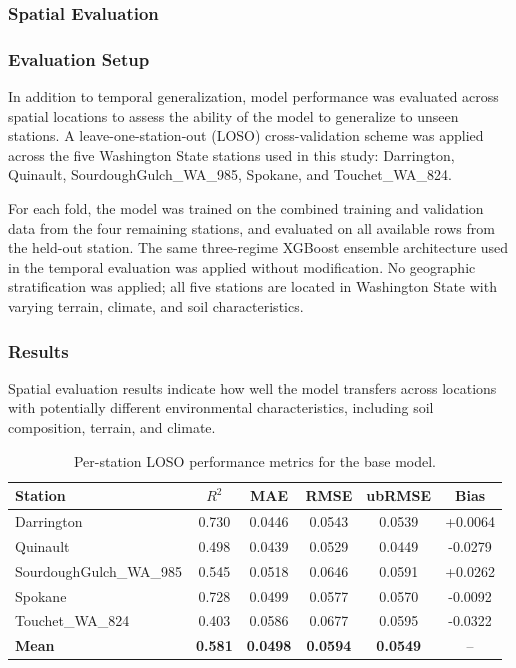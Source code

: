 \subsubsection*{Spatial Evaluation}

\subsubsection*{Evaluation Setup}
In addition to temporal generalization, model performance was evaluated across spatial locations
to assess the ability of the model to generalize to unseen stations. A leave-one-station-out
(LOSO) cross-validation scheme was applied across the five Washington State stations used in
this study: Darrington, Quinault, SourdoughGulch\_WA\_985, Spokane, and Touchet\_WA\_824.

For each fold, the model was trained on the combined training and validation data from the
four remaining stations, and evaluated on all available rows from the held-out station. The
same three-regime XGBoost ensemble architecture used in the temporal evaluation was applied
without modification. No geographic stratification was applied; all five stations are located
in Washington State with varying terrain, climate, and soil characteristics.

\subsubsection*{Results}
Spatial evaluation results indicate how well the model transfers across locations with
potentially different environmental characteristics, including soil composition, terrain,
and climate.

\begin{table}[H]
\centering
\begin{tabular}{lccccc}
\toprule
\textbf{Station} & \textbf{$R^2$} & \textbf{MAE} & \textbf{RMSE} & \textbf{ubRMSE} & \textbf{Bias} \\
\midrule
Darrington              & 0.730 & 0.0446 & 0.0543 & 0.0539 & +0.0064 \\
Quinault                & 0.498 & 0.0439 & 0.0529 & 0.0449 & -0.0279 \\
SourdoughGulch\_WA\_985 & 0.545 & 0.0518 & 0.0646 & 0.0591 & +0.0262 \\
Spokane                 & 0.728 & 0.0499 & 0.0577 & 0.0570 & -0.0092 \\
Touchet\_WA\_824        & 0.403 & 0.0586 & 0.0677 & 0.0595 & -0.0322 \\
\midrule
\textbf{Mean}           & \textbf{0.581} & \textbf{0.0498} & \textbf{0.0594} & \textbf{0.0549} & -- \\
\bottomrule
\end{tabular}
\caption{Per-station LOSO performance metrics for the base model.}
\end{table}

